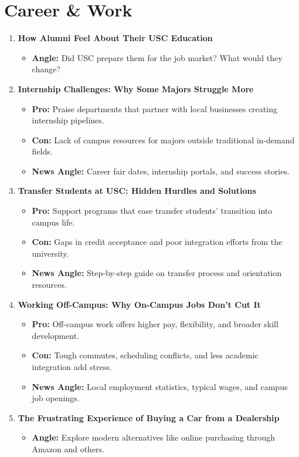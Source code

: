 \documentclass{article}
\begin{document}
\section*{Career \& Work}

\begin{enumerate}[leftmargin=*]
    \item \textbf{How Alumni Feel About Their USC Education}
    \begin{itemize}
        \item \textbf{Angle:} Did USC prepare them for the job market? What would they change?
    \end{itemize}

    \item \textbf{Internship Challenges: Why Some Majors Struggle More}
    \begin{itemize}
        \item \textbf{Pro:} Praise departments that partner with local businesses creating internship pipelines.
        \item \textbf{Con:} Lack of campus resources for majors outside traditional in-demand fields.
        \item \textbf{News Angle:} Career fair dates, internship portals, and success stories.
    \end{itemize}

    \item \textbf{Transfer Students at USC: Hidden Hurdles and Solutions}
    \begin{itemize}
        \item \textbf{Pro:} Support programs that ease transfer students' transition into campus life.
        \item \textbf{Con:} Gaps in credit acceptance and poor integration efforts from the university.
        \item \textbf{News Angle:} Step-by-step guide on transfer process and orientation resources.
    \end{itemize}

    \item \textbf{Working Off-Campus: Why On-Campus Jobs Don't Cut It}
    \begin{itemize}
        \item \textbf{Pro:} Off-campus work offers higher pay, flexibility, and broader skill development.
        \item \textbf{Con:} Tough commutes, scheduling conflicts, and less academic integration add stress.
        \item \textbf{News Angle:} Local employment statistics, typical wages, and campus job openings.
    \end{itemize}

    \item \textbf{The Frustrating Experience of Buying a Car from a Dealership}
    \begin{itemize}
        \item \textbf{Angle:} Explore modern alternatives like online purchasing through Amazon and others.
    \end{itemize}
\end{enumerate}
\end{document}
